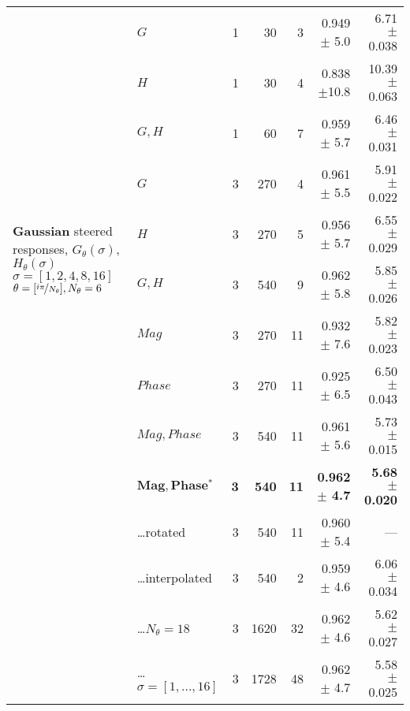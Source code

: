 \begin{tabularx}{\linewidth}{p{3.1cm} p{3cm} r r r r r}
\midrule
\multirow{10}{3.1cm}{\centering
    \textbf{Gaussian}
    \newline steered responses,
    \newline
    \newline $G_{\theta}(\sigma)$, $H_{\theta}(\sigma)$
    \newline $\sigma = [1, 2, 4, 8, 16]$
    \newline $\theta = [ \nicefrac{i\pi}{N_\theta} ], N_\theta = 6$ }
        & $G$                       & 1 &  30   &  3    & 0.949 $\pm$ 5.0   & 6.71 $\pm$ 0.038 \\
        & $H$                       & 1 &  30   &  4    & 0.838 $\pm$10.8   &10.39 $\pm$ 0.063\\
        & $G,H$                     & 1 &  60   &  7    & 0.959 $\pm$ 5.7   & 6.46 $\pm$ 0.031 \\
        & $G$                       & 3 & 270   &  4    & 0.961 $\pm$ 5.5   & 5.91 $\pm$ 0.022 \\
        & $H$                       & 3 & 270   &  5    & 0.956 $\pm$ 5.7   & 6.55 $\pm$ 0.029 \\
        & $G,H$                     & 3 & 540   &  9    & 0.962 $\pm$ 5.8   & 5.85 $\pm$ 0.026 \\
        & $Mag$                     & 3 & 270   & 11    & 0.932 $\pm$ 7.6   & 5.82 $\pm$ 0.023 \\
        & $Phase$                   & 3 & 270   & 11    & 0.925 $\pm$ 6.5   & 6.50 $\pm$ 0.043 \\
        & $Mag, Phase$              & 3 & 540   & 11    & 0.961 $\pm$ 5.6   & 5.73 $\pm$ 0.015 \\
        & $\mathbf{Mag, Phase{^*}}$ & \textbf{3} & \textbf{540} & \textbf{11} & \textbf{0.962 $\pm$ 4.7} & \textbf{5.68 $\pm$ 0.020} \\
        & \hspace{2mm} \ldots rotated
                                    & 3 & 540   & 11    & 0.960 $\pm$ 5.4   & --- \\
        & \hspace{2mm} \ldots interpolated
                                    & 3 & 540   &  2    & 0.959 $\pm$ 4.6   & 6.06 $\pm$ 0.034 \\
        & \hspace{2mm} \ldots $N_\theta = 18$
                                    & 3 &1620   & 32    & 0.962 $\pm$ 4.6   & 5.62 $\pm$ 0.027 \\
        & \hspace{2mm} \ldots ${\sigma = [1,...,16]}$
                                    & 3 &1728   & 48    & 0.962 $\pm$ 4.7   & 5.58 $\pm$ 0.025 \\


\end{tabularx}
